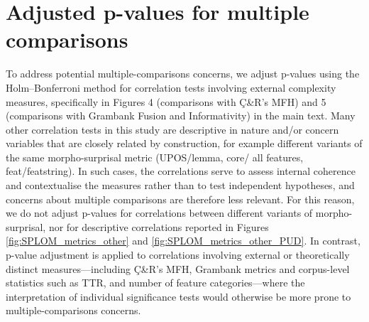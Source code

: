 \documentclass[USenglish]{article}
\begin{document}



\FloatBarrier
\newpage

\section{Adjusted p-values for multiple comparisons}\label{subsec:adjustedPValues}
To address potential multiple-comparisons concerns, we adjust p-values using the Holm–Bonferroni method \citep{holm_simple_1979} for correlation tests involving external complexity measures, specifically in Figures 4
(comparisons with Ç\&R’s MFH) and 5
(comparisons with Grambank Fusion and Informativity) in the main text.
Many other correlation tests in this study are descriptive in nature and/or concern variables that are closely related by construction, for example different variants of the same morpho-surprisal metric (UPOS/lemma, core/ all features, feat/featstring). 
In such cases, the correlations serve to assess internal coherence and contextualise the measures rather than to test independent hypotheses, and concerns about multiple comparisons are therefore less relevant.
For this reason, we do not adjust p-values for correlations between different variants of morpho-surprisal, nor for descriptive correlations reported in Figures \ref{fig:SPLOM_metrics_other} and \ref{fig:SPLOM_metrics_other_PUD}. 
In contrast, p-value adjustment is applied to correlations involving external or theoretically distinct measures—including Ç\&R’s MFH, Grambank metrics and corpus-level statistics such as TTR, and number of feature categories—where the interpretation of individual significance tests would otherwise be more prone to multiple-comparisons concerns.
\end{document}
